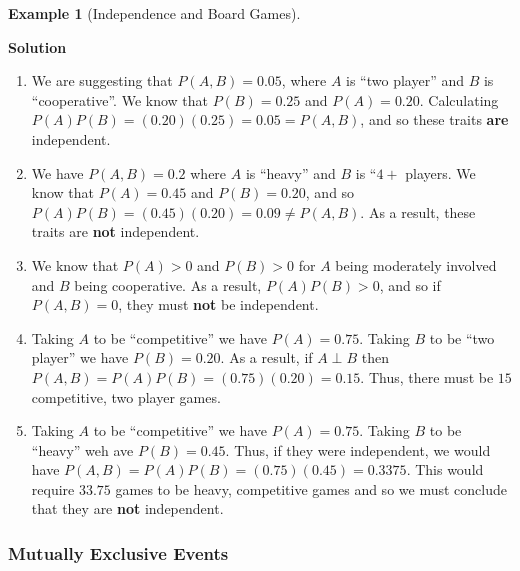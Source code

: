 \documentclass[
  letterpaper,
  DIV=11,
  numbers=noendperiod]{scrreprt}
\theoremstyle{definition}
\theoremstyle{definition}
\theoremstyle{definition}
\newtheorem{example}{Example}[chapter]
\theoremstyle{remark}
\begin{document}
\begin{example}[Independence and Board
Games]
\begin{tcolorbox}[enhanced jigsaw, colback=white, breakable, rightrule=.15mm, leftrule=.75mm, toprule=.15mm, left=2mm, arc=.35mm, opacityback=0, bottomrule=.15mm]

\vspace{-3mm}\textbf{Solution}\vspace{3mm}

\begin{enumerate}
\def\labelenumi{\alph{enumi}.}
\item
  We are suggesting that \(P(A,B) = 0.05\), where \(A\) is ``two
  player'' and \(B\) is ``cooperative''. We know that \(P(B) = 0.25\)
  and \(P(A) = 0.20\). Calculating
  \(P(A)P(B) = (0.20)(0.25) = 0.05 = P(A,B)\), and so these traits
  \textbf{are} independent.
\item
  We have \(P(A,B) = 0.2\) where \(A\) is ``heavy'' and \(B\) is
  ``\(4+\) players. We know that \(P(A) = 0.45\) and \(P(B) = 0.20\),
  and so \(P(A)P(B) = (0.45)(0.20) = 0.09 \neq P(A,B)\). As a result,
  these traits are \textbf{not} independent.
\item
  We know that \(P(A) > 0\) and \(P(B) > 0\) for \(A\) being moderately
  involved and \(B\) being cooperative. As a result, \(P(A)P(B) > 0\),
  and so if \(P(A,B) = 0\), they must \textbf{not} be independent.
\item
  Taking \(A\) to be ``competitive'' we have \(P(A) = 0.75\). Taking
  \(B\) to be ``two player'' we have \(P(B) = 0.20\). As a result, if
  \(A\perp B\) then \(P(A,B) = P(A)P(B) = (0.75)(0.20) = 0.15\). Thus,
  there must be \(15\) competitive, two player games.
\item
  Taking \(A\) to be ``competitive'' we have \(P(A) = 0.75\). Taking
  \(B\) to be ``heavy'' weh ave \(P(B) = 0.45\). Thus, if they were
  independent, we would have
  \(P(A,B) = P(A)P(B) = (0.75)(0.45) = 0.3375\). This would require
  \(33.75\) games to be heavy, competitive games and so we must conclude
  that they are \textbf{not} independent.
\end{enumerate}

\end{tcolorbox}

\end{example}

\subsubsection{Mutually Exclusive
Events}\label{mutually-exclusive-events}
\end{document}

